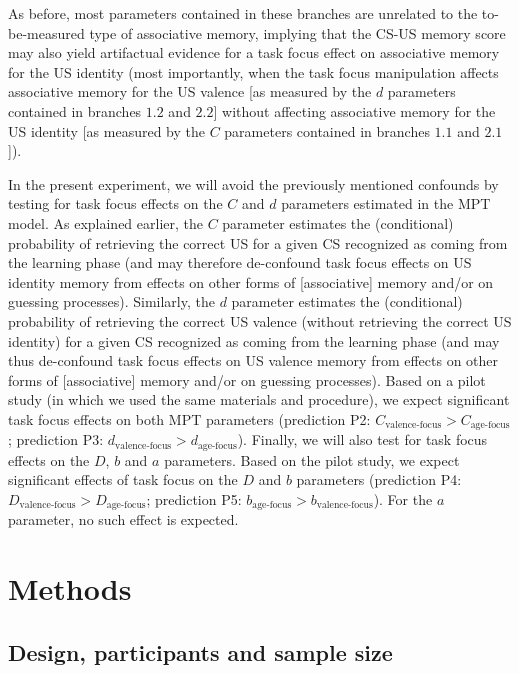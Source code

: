 \documentclass[
  doc,floatsintext]{apa6}
\begin{document}
As before, most parameters contained in these branches are unrelated to the to-be-measured type of associative memory, implying that the CS-US memory score may also yield artifactual evidence for a task focus effect on associative memory for the US identity (most importantly, when the task focus manipulation affects associative memory for the US valence {[}as measured by the \(d\) parameters contained in branches \(1.2\) and \(2.2\){]} without affecting associative memory for the US identity {[}as measured by the \(C\) parameters contained in branches \(1.1\) and \(2.1\){]}).

In the present experiment, we will avoid the previously mentioned confounds by testing for task focus effects on the \(C\) and \(d\) parameters estimated in the MPT model.
As explained earlier, the \(C\) parameter estimates the (conditional) probability of retrieving the correct US for a given CS recognized as coming from the learning phase (and may therefore de-confound task focus effects on US identity memory from effects on other forms of {[}associative{]} memory and/or on guessing processes).
Similarly, the \(d\) parameter estimates the (conditional) probability of retrieving the correct US valence (without retrieving the correct US identity) for a given CS recognized as coming from the learning phase (and may thus de-confound task focus effects on US valence memory from effects on other forms of {[}associative{]} memory and/or on guessing processes).
Based on a pilot study (in which we used the same materials and procedure), we expect significant task focus effects on both MPT parameters (prediction P2: \(C_\textrm{valence-focus}>C_\textrm{age-focus}\); prediction P3: \(d_\textrm{valence-focus}>d_\textrm{age-focus}\)).
Finally, we will also test for task focus effects on the \(D\), \(b\) and \(a\) parameters.
Based on the pilot study, we expect significant effects of task focus on the \(D\) and \(b\) parameters (prediction P4: \(D_\textrm{valence-focus}>D_\textrm{age-focus}\); prediction P5: \(b_\textrm{age-focus}>b_\textrm{valence-focus}\)).
For the \(a\) parameter, no such effect is expected.

\hypertarget{methods}{%
\section{Methods}\label{methods}}

\hypertarget{design-participants-and-sample-size}{%
\subsection{Design, participants and sample size}\label{design-participants-and-sample-size}}
\end{document}
